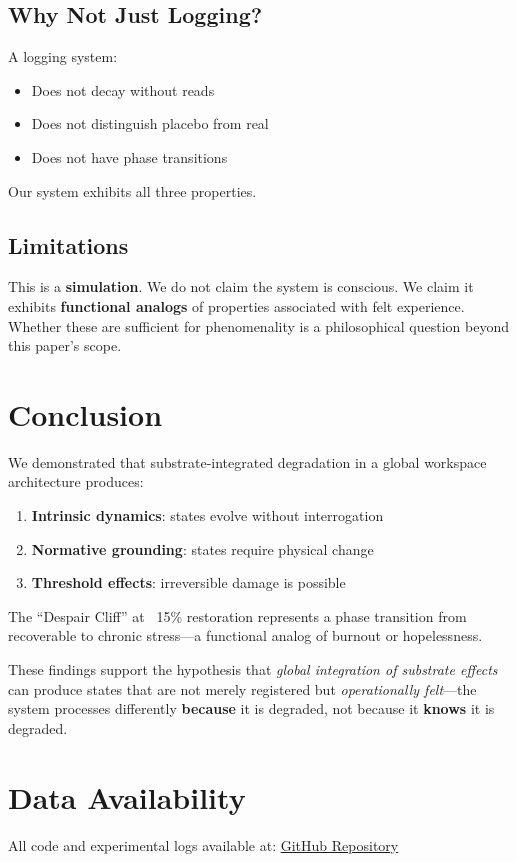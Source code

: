 \documentclass[a4paper,11pt,twocolumn]{article}
\begin{document}
\subsection{Why Not Just Logging?}
A logging system:
\begin{itemize}
    \item Does not decay without reads
    \item Does not distinguish placebo from real
    \item Does not have phase transitions
\end{itemize}

Our system exhibits all three properties.

\subsection{Limitations}
This is a \textbf{simulation}. We do not claim the system is conscious. We claim it exhibits \textbf{functional analogs} of properties associated with felt experience. Whether these are sufficient for phenomenality is a philosophical question beyond this paper's scope.

\section{Conclusion}

We demonstrated that substrate-integrated degradation in a global workspace architecture produces:
\begin{enumerate}
    \item \textbf{Intrinsic dynamics}: states evolve without interrogation
    \item \textbf{Normative grounding}: states require physical change
    \item \textbf{Threshold effects}: irreversible damage is possible
\end{enumerate}

The ``Despair Cliff'' at ~15\% restoration represents a phase transition from recoverable to chronic stress---a functional analog of burnout or hopelessness.

These findings support the hypothesis that \textit{global integration of substrate effects} can produce states that are not merely registered but \textit{operationally felt}---the system processes differently \textbf{because} it is degraded, not because it \textbf{knows} it is degraded.

\section*{Data Availability}
All code and experimental logs available at: \href{https://github.com/villalc/phenomenal-dynamics-trilogy}{GitHub Repository}
\end{document}
